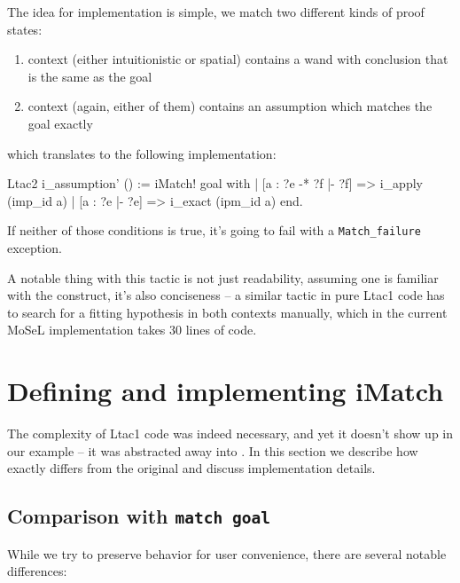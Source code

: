 The idea for implementation is simple, we match two different kinds of proof states:
\begin{enumerate}
\item context (either intuitionistic or spatial) contains a wand with conclusion that is the same as the goal
\item context (again, either of them) contains an assumption which matches the goal exactly
\end{enumerate}

which translates to the following implementation:

\begin{minipage}{\linewidth}
\begin{coq}
Ltac2 i_assumption' () :=
  iMatch! goal with
  | [a : ?e -* ?f |- ?f] => i_apply (imp_id a)
  | [a : ?e |- ?e] => i_exact (ipm_id a)
  end.
\end{coq}
\end{minipage}

If neither of those conditions is true, it's going to fail with a {\color{red} \texttt{Match\_failure}} exception.

A notable thing with this tactic is not just readability, assuming one is familiar with the  construct,
it's also conciseness -- a similar tactic in pure Ltac1 code has to search for a fitting hypothesis in both contexts manually, which in the current MoSeL implementation takes 30 lines of code.

\section{Defining and implementing iMatch}
\label{sec:defin-impl-imatch}

The complexity of Ltac1 code was indeed necessary, and yet it doesn't show up in our example -- it was abstracted away into .
In this section we describe how exactly  differs from the original  and discuss implementation details.

\subsection{Comparison with \texttt{match goal}}

While we try to preserve  behavior for user convenience, there are several notable differences:

